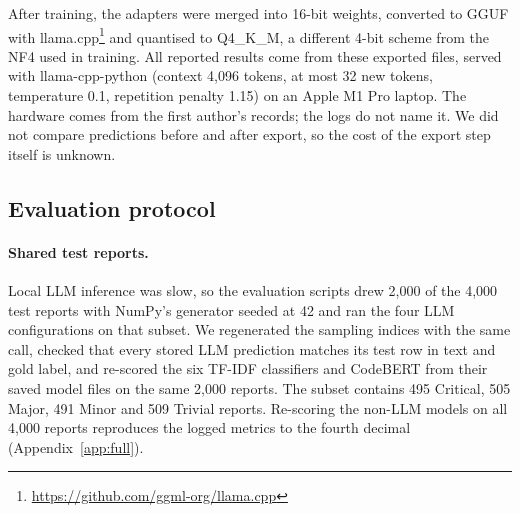 \documentclass[a4paper,fleqn]{cas-sc}
\begin{document}
After training, the adapters were merged into 16-bit weights, converted to GGUF with
llama.cpp\footnote{\url{https://github.com/ggml-org/llama.cpp}} and quantised to
Q4\_K\_M, a different 4-bit scheme from the NF4 used in training. All reported results
come from these exported files, served with llama-cpp-python (context 4,096 tokens, at
most 32 new tokens, temperature 0.1, repetition penalty 1.15) on an Apple M1 Pro laptop.
The hardware comes from the first author's records; the logs do not name it. We did not compare predictions before and after export, so the cost of the
export step itself is unknown.

\begin{table}[width=\textwidth,cols=4,pos=t]
\caption{Training configuration of the learned models, as recorded in the training
scripts and logs. LLM losses are averaged over each epoch and cover all tokens of each
record; CodeBERT's log keeps no per-epoch average. The NF4 settings come from the
quantisation configuration of the base checkpoints.}
\label{tab:training}
\footnotesize\setlength{\tabcolsep}{4pt}

\end{table}

\subsection{Evaluation protocol}
\label{sec:protocol}

\paragraph{Shared test reports.} Local LLM inference was slow, so the evaluation
scripts drew 2,000 of the 4,000 test reports with NumPy's generator seeded at 42 and ran
the four LLM configurations on that subset. We regenerated the sampling indices with the
same call, checked that every stored LLM prediction matches its test row in text and
gold label, and re-scored the six TF-IDF classifiers and CodeBERT from their saved model
files on the same 2,000 reports. The subset contains 495
Critical, 505 Major, 491 Minor and 509 Trivial reports. Re-scoring the non-LLM models
on all 4,000 reports reproduces the logged metrics to the fourth decimal
(Appendix~\ref{app:full}).
\end{document}
